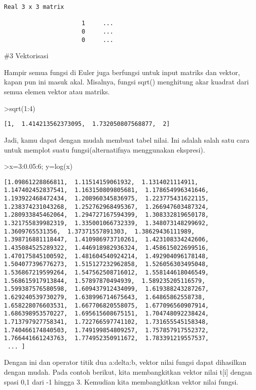 \documentclass[
]{book}
\begin{document}
\begin{verbatim}
Real 3 x 3 matrix

                      1     ...
                      0     ...
                      0     ...
\end{verbatim}

\#3 Vektorisasi

Hampir semua fungsi di Euler juga berfungsi untuk input matriks dan vektor, kapan pun ini masuk akal. Misalnya, fungsi sqrt() menghitung akar kuadrat dari semua elemen vektor atau matriks.

\textgreater sqrt(1:4)

\begin{verbatim}
[1,  1.414213562373095,  1.732050807568877,  2]
\end{verbatim}

Jadi, kamu dapat dengan mudah membuat tabel nilai. Ini adalah salah satu cara untuk memplot suatu fungsi(alternatifnya menggunakan ekspresi).

\textgreater x=3:0.05:6; y=log(x)

\begin{verbatim}
[1.09861228866811,  1.11514159061932,  1.1314021114911,
1.147402452837541,  1.163150809805681,  1.178654996341646,
1.193922468472434,  1.208960345836975,  1.223775431622115,
1.238374231043268,  1.252762968495367,  1.266947603487324,
1.280933845462064,  1.294727167594399,  1.308332819650178,
1.321755839982319,  1.335001066732339,  1.348073148299692,
1.3609765531356,  1.37371557891303,  1.38629436111989,
1.398716881118447,  1.410986973710261,  1.423108334242606,
1.435084525289322,  1.446918982936324,  1.458615022699516,
1.470175845100592,  1.481604540924214,  1.492904096178148,
1.504077396776273,  1.515127232962858,  1.526056303495048,
1.536867219599264,  1.547562508716012,  1.558144618046549,
1.568615917913844,  1.57897870494939,  1.589235205116579,
1.599387576580598,  1.609437912434099,  1.619388243287267,
1.629240539730279,  1.638996714675643,  1.64865862558738,
1.658228076603531,  1.667706820558075,  1.677096560907914,
1.686398953570227,  1.695615608675151,  1.704748092238424,
1.713797927758341,  1.722766597741102,  1.731655545158348,
1.740466174840503,  1.749199854809257,  1.757857917552372,
1.766441661243763,  1.774952350911672,  1.783391219557537,
 ... ]
\end{verbatim}

Dengan ini dan operator titik dua a:delta:b, vektor nilai fungsi dapat dihasilkan dengan mudah. Pada contoh berikut, kita membangkitkan vektor nilai t{[}i{]} dengan spasi 0,1 dari -1 hingga 3. Kemudian kita membangkitkan vektor nilai fungsi.
\end{document}
